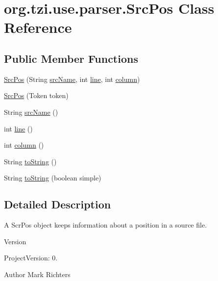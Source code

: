 \hypertarget{classorg_1_1tzi_1_1use_1_1parser_1_1_src_pos}{\section{org.\-tzi.\-use.\-parser.\-Src\-Pos Class Reference}
\label{classorg_1_1tzi_1_1use_1_1parser_1_1_src_pos}
}
\subsection*{Public Member Functions}
\begin{DoxyCompactItemize}
\item 
\hyperlink{classorg_1_1tzi_1_1use_1_1parser_1_1_src_pos_ae06ebe8078deaefaa8225426799cc3be}{Src\-Pos} (String \hyperlink{classorg_1_1tzi_1_1use_1_1parser_1_1_src_pos_a579e1f4326f20eb88743bd6959c12e8e}{src\-Name}, int \hyperlink{classorg_1_1tzi_1_1use_1_1parser_1_1_src_pos_a38dd5d978ff982295bf11cf6a7267355}{line}, int \hyperlink{classorg_1_1tzi_1_1use_1_1parser_1_1_src_pos_a50dd3274d0479d31c122835a7f94e188}{column})
\item 
\hyperlink{classorg_1_1tzi_1_1use_1_1parser_1_1_src_pos_a3c91415ba328edcfdcd9c10f95c91a9c}{Src\-Pos} (Token token)
\item 
String \hyperlink{classorg_1_1tzi_1_1use_1_1parser_1_1_src_pos_a579e1f4326f20eb88743bd6959c12e8e}{src\-Name} ()
\item 
int \hyperlink{classorg_1_1tzi_1_1use_1_1parser_1_1_src_pos_a38dd5d978ff982295bf11cf6a7267355}{line} ()
\item 
int \hyperlink{classorg_1_1tzi_1_1use_1_1parser_1_1_src_pos_a50dd3274d0479d31c122835a7f94e188}{column} ()
\item 
String \hyperlink{classorg_1_1tzi_1_1use_1_1parser_1_1_src_pos_a7f47541289f9a6d50c5f0b8fbc14caec}{to\-String} ()
\item 
String \hyperlink{classorg_1_1tzi_1_1use_1_1parser_1_1_src_pos_a96c5fbb39277652e3e1614ff5115d1ec}{to\-String} (boolean simple)
\end{DoxyCompactItemize}


\subsection{Detailed Description}
A Scr\-Pos object keeps information about a position in a source file.

\begin{DoxyVersion}{Version}

\end{DoxyVersion}
\begin{DoxyParagraph}{Project\-Version\-:}
0. 
\end{DoxyParagraph}
\begin{DoxyAuthor}{Author}
Mark Richters 
\end{DoxyAuthor}


